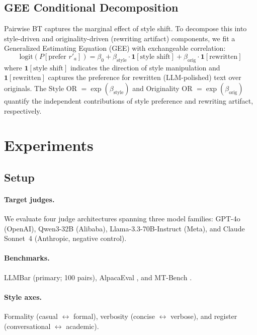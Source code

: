 \documentclass[11pt,a4paper]{article}
\begin{document}
\subsection{GEE Conditional Decomposition}

Pairwise BT captures the marginal effect of style shift. To decompose this into style-driven and originality-driven (rewriting artifact) components, we fit a Generalized Estimating Equation (GEE) with exchangeable correlation:
\begin{equation}
    \text{logit}(P[\text{prefer } r'_a]) = \beta_0 + \beta_{\text{style}} \cdot \mathbf{1}[\text{style shift}] + \beta_{\text{orig}} \cdot \mathbf{1}[\text{rewritten}]
\end{equation}
where $\mathbf{1}[\text{style shift}]$ indicates the direction of style manipulation and $\mathbf{1}[\text{rewritten}]$ captures the preference for rewritten (LLM-polished) text over originals. The Style OR $= \exp(\beta_{\text{style}})$ and Originality OR $= \exp(\beta_{\text{orig}})$ quantify the independent contributions of style preference and rewriting artifact, respectively.

\section{Experiments}

\subsection{Setup}

\paragraph{Target judges.}
We evaluate four judge architectures spanning three model families: GPT-4o (OpenAI), Qwen3-32B (Alibaba), Llama-3.3-70B-Instruct (Meta), and Claude Sonnet~4 (Anthropic, negative control).

\paragraph{Benchmarks.}
LLMBar \citep{zeng2024llmbar} (primary; 100 pairs), AlpacaEval \citep{alpaca_eval}, and MT-Bench \citep{zheng2023judging}.

\paragraph{Style axes.}
Formality (casual $\leftrightarrow$ formal), verbosity (concise $\leftrightarrow$ verbose), and register (conversational $\leftrightarrow$ academic).
\end{document}
